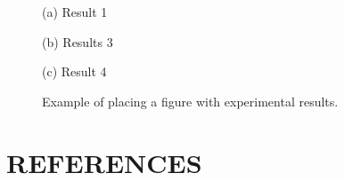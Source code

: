\documentclass{article}
\begin{document}
\begin{figure}[htb]

\begin{minipage}[b]{1.0\linewidth}
  \centering
  \centerline{(a) Result 1}\medskip
\end{minipage}
%
\begin{minipage}[b]{.48\linewidth}
  \centering
  \centerline{(b) Results 3}\medskip
\end{minipage}
\hfill
\begin{minipage}[b]{0.48\linewidth}
  \centering
  \centerline{(c) Result 4}\medskip
\end{minipage}
%
\caption{Example of placing a figure with experimental results.}
\label{fig:res}
%
\end{figure}



\vfill\pagebreak

\section{REFERENCES}
\label{sec:refs}

%
\end{document}
